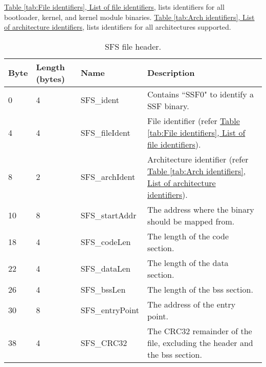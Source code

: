 \documentclass[a4paper,oneside]{memoir}
\begin{document}
\hyperref[tab:File identifiers]{Table \ref*{tab:File identifiers}, List of file identifiers}, lists identifiers for all bootloader, kernel, and kernel module binaries. \hyperref[tab:Arch identifiers]{Table \ref*{tab:Arch identifiers}, List of architecture identifiers}, lists identifiers for all architectures supported.

\begin{table}
    \centering
    \begin{tabular}{ l l l p{4.75cm} }
        \hline
            Byte & Length \small (bytes)    & Name                & Description                                          \\ \hline
            0    & 4                        & SFS\_ident          & Contains ``SSF0" to identify a SSF binary.           \\
            4    & 4                        & SFS\_fileIdent      & File identifier (refer \hyperref[tab:File identifiers]{Table \ref*{tab:File identifiers}, List of file identifiers}). \\
            8    & 2                        & SFS\_archIdent      & Architecture identifier (refer \hyperref[tab:Arch identifiers]{Table \ref*{tab:Arch identifiers}, List of architecture identifiers}). \\
            10   & 8                        & SFS\_startAddr      & The address where the binary should be mapped from.  \\
            18   & 4                        & SFS\_codeLen        & The length of the code section.                      \\
            22   & 4                        & SFS\_dataLen        & The length of the data section.                      \\
            26   & 4                        & SFS\_bssLen         & The length of the bss section.                       \\
            30   & 8                        & SFS\_entryPoint     & The address of the entry point.                      \\
            38   & 4                        & SFS\_CRC32          & The CRC32 remainder of the file, excluding the header and the bss section. \\
        \hline
    \end{tabular}
    \caption{SFS file header. \label{tab:File header}}
\end{table}
\end{document}
